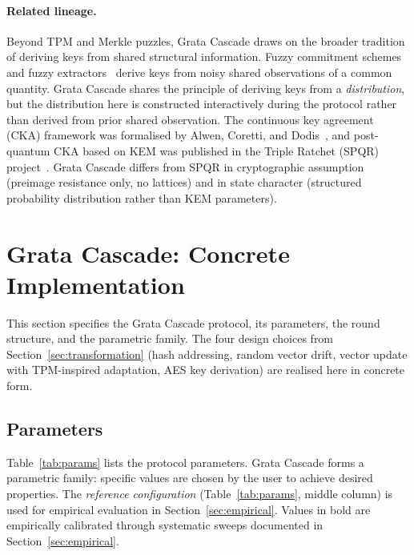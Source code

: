 \documentclass[11pt,a4paper]{article}
\begin{document}
\paragraph{Related lineage.} Beyond TPM and Merkle puzzles, Grata Cascade draws on the broader tradition of deriving keys from shared structural information. Fuzzy commitment schemes~\cite{JW1999} and fuzzy extractors~\cite{Dodis2004} derive keys from noisy shared observations of a common quantity. Grata Cascade shares the principle of deriving keys from a \emph{distribution}, but the distribution here is constructed interactively during the protocol rather than derived from prior shared observation. The continuous key agreement (CKA) framework was formalised by Alwen, Coretti, and Dodis~\cite{ACD19}, and post-quantum CKA based on KEM was published in the Triple Ratchet (SPQR) project~\cite{SPQR2025}. Grata Cascade differs from SPQR in cryptographic assumption (preimage resistance only, no lattices) and in state character (structured probability distribution rather than KEM parameters).

\section{Grata Cascade: Concrete Implementation}\label{sec:concrete}

This section specifies the Grata Cascade protocol, its parameters, the round structure, and the parametric family. The four design choices from Section~\ref{sec:transformation} (hash addressing, random vector drift, vector update with TPM-inspired adaptation, AES key derivation) are realised here in concrete form.

\subsection{Parameters}

Table~\ref{tab:params} lists the protocol parameters. Grata Cascade forms a parametric family: specific values are chosen by the user to achieve desired properties. The \emph{reference configuration} (Table~\ref{tab:params}, middle column) is used for empirical evaluation in Section~\ref{sec:empirical}. Values in bold are empirically calibrated through systematic sweeps documented in Section~\ref{sec:empirical}.
\end{document}
